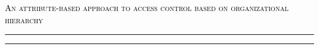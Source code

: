 \begin{center}
\chaptitlefont %
\begin{center}\textcolor{black}{\textsc{An attribute-based approach to access control based on organizational hierarchy}}
\end{center}
\end{center}
\vspace{8mm}
\textcolor{black}{\hrule height 4.5pt}%
\vspace{1mm}
\textcolor{black}{\hrule height 1.5pt}
